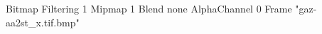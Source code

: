 {Bitmap
	{Filtering 1}
	{Mipmap 1}
	{Blend none}
	{AlphaChannel 0}
	{Frame "gaz-aa2st_x.tif.bmp"}
}
